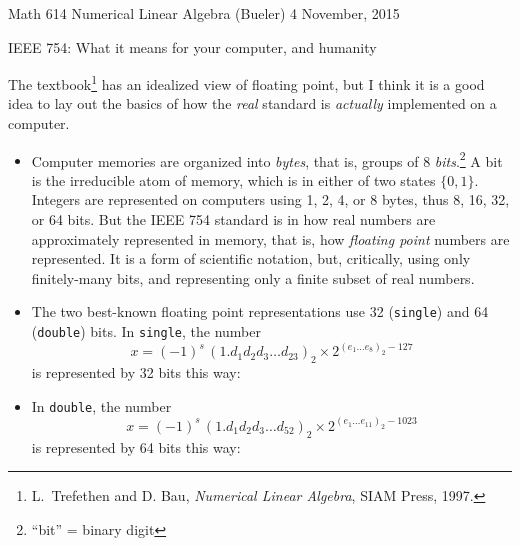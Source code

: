\documentclass[11pt]{amsart}
\begin{document}
\scriptsize \noindent Math 614 Numerical Linear Algebra (Bueler) \hfill 4 November, 2015
\normalsize

\medskip\bigskip
\Large\centerline{IEEE 754: What it means for your computer, and humanity}

\bigskip
\normalsize

\thispagestyle{empty}

\bigskip

The textbook\footnote{L.~Trefethen and D. Bau, \emph{Numerical Linear Algebra}, SIAM Press, 1997.} has an idealized view of floating point, but I think it is a good idea to lay out the basics of how the \emph{real} standard is \emph{actually} implemented on a computer.

\begin{itemize}
\item Computer memories are organized into \emph{bytes}, that is, groups of 8 \emph{bits}.\footnote{``bit'' = binary digit}  A bit is the irreducible atom of memory, which is in either of two states $\{0,1\}$.  Integers are represented on computers using 1, 2, 4, or 8 bytes, thus 8, 16, 32, or 64 bits.  But the IEEE 754 standard is in how real numbers are approximately represented in memory, that is, how \emph{floating point} numbers are represented.  It is a form of scientific notation, but, critically, using only finitely-many bits, and representing only a finite subset of real numbers.

\item The two best-known floating point representations use 32 (\texttt{single}) and 64 (\texttt{double}) bits.  In \texttt{single}, the number
       $$x = (-1)^s \, \left(1.d_1 d_2 d_3 \dots d_{23}\right)_{2} \times 2^{\left(e_1\dots e_8\right)_2 - 127}$$
is represented by 32 bits this way:

\medskip
\hspace{-30mm}

\item  In \texttt{double}, the number
       $$x = (-1)^s \, \left(1.d_1 d_2 d_3 \dots d_{52}\right)_{2} \times 2^{\left(e_1\dots e_{11}\right)_2 - 1023}$$
is represented by 64 bits this way:


\end{itemize}
\end{document}
